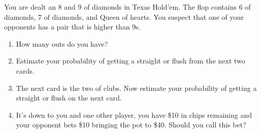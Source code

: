 \documentclass[12pt,letterpaper]{hmcpset}
\begin{document}
\begin{problem}[4]
  You are dealt an 8 and 9 of diamonds in Texas Hold'em.
  The flop contains 6 of diamonds, 7 of diamonds, and Queen of hearts.
  You suspect that one of your opponents has a pair that is higher than 9s.
  \begin{enumerate}[label=(\alph*)]
  \item How many outs do you have?
  \item Estimate your probability of getting a straight or flush from the next two cards.
  \item The next card is the two of clubs.
    Now estimate your probability of getting a straight or flush on the next card.
  \item It's down to you and one other player, you have \$10 in chips remaining and your opponent bets \$10 bringing the pot to \$40.
    Should you call this bet?
  \end{enumerate}
\end{problem}
\begin{solution}
\end{solution}
\end{document}
